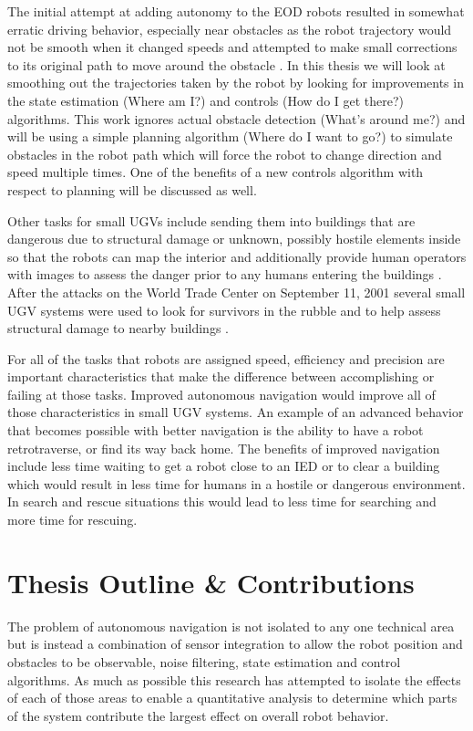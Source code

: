 The initial attempt at adding autonomy to the EOD robots resulted in somewhat erratic driving behavior, especially near obstacles as the robot trajectory would not be smooth when it changed speeds and attempted to make small corrections to its original path to move around the obstacle \cite{Bruch00}. In this thesis we will look at smoothing out the trajectories taken by the robot by looking for improvements in the state estimation (Where am I?) and controls (How do I get there?) algorithms. This work ignores actual obstacle detection (What's around me?) and will be using a simple planning algorithm (Where do I want to go?) to simulate obstacles in the robot path which will force the robot to change direction and speed multiple times. One of the benefits of a new controls algorithm with respect to planning will be discussed as well.

Other tasks for small UGVs include sending them into buildings that are dangerous due to structural damage or unknown, possibly hostile elements inside so that the robots can map the interior and additionally provide human operators with images to assess the danger prior to any humans entering the buildings \cite{CongressUGV06}. After the attacks on the World Trade Center on September 11, 2001 several small UGV systems were used to look for survivors in the rubble and to help assess structural damage to nearby buildings \cite{Everett02}.

For all of the tasks that robots are assigned speed, efficiency and precision are important characteristics that make the difference between accomplishing or failing at those tasks. Improved autonomous navigation would improve all of those characteristics in small UGV systems. An example of an advanced behavior that becomes possible with better navigation is the ability to have a robot retrotraverse, or find its way back home. The benefits of improved navigation include less time waiting to get a robot close to an IED or to clear a building which would result in less time for humans in a hostile or dangerous environment. In search and rescue situations this would lead to less time for searching and more time for rescuing.

\section{Thesis Outline \& Contributions}
\label{sec:outline}
The problem of autonomous navigation is not isolated to any one technical area but is instead a combination of sensor integration to allow the robot position and obstacles to be observable, noise filtering, state estimation and control algorithms. As much as possible this research has attempted to isolate the effects of each of those areas to enable a quantitative analysis to determine which parts of the system contribute the largest effect on overall robot behavior.

